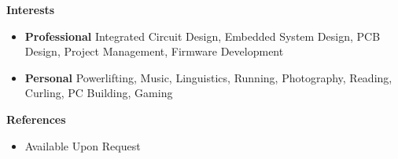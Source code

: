 \documentclass[letterpaper,12pt]{article}[leftmargin=*]
\def \entryspacing {-0pt}
\renewcommand{\section}[2]{\vspace{5pt}
  \colorbox{secondary}{\color{white}\raggedbottom\normalsize\textbf{{#1}{\hspace{7pt}#2}}}
}
\newcommand{\resumeEntryStart}{\begin{itemize}[leftmargin=2.5mm]}
\newcommand{\resumeEntryEnd}{\end{itemize}\vspace{\entryspacing}}
\newcommand{\resumeEntryS}[2]{
  \item[]\small{
    \textbf{\color{primary}#1 }{ #2 \vspace{-6pt}}
  }
}
\begin{document}
\section{\faGamepad}{Interests}

 \resumeEntryStart
  \resumeEntryS{Professional }{Integrated Circuit Design, Embedded System Design, PCB Design, Project Management, Firmware Development}
  \resumeEntryS{Personal }{Powerlifting, Music, Linguistics, Running, Photography, Reading, Curling, PC Building, Gaming}
 \resumeEntryEnd
\section{\faEnvelope}{References}

 \resumeEntryStart
  \resumeEntryS{}{Available Upon Request}
 \resumeEntryEnd
\end{document}
